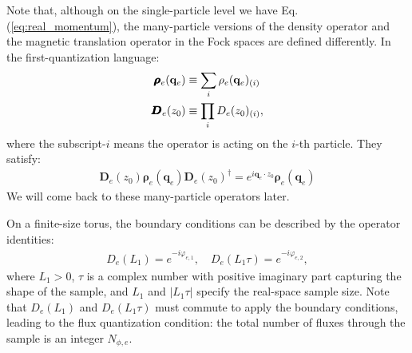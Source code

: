 Note that, although on the single-particle level we have Eq.(\ref{eq:real_momentum}),  the many-particle versions of the density operator and the magnetic translation operator in the Fock spaces are defined differently. In the first-quantization language:
\begin{align}
    \pmb{\boldsymbol\rho}_e(\mathbf q_e) & \equiv \sum_i \rho_e(\mathbf q_e)_{(i)}\notag \\
    \pmb{\bm D}_e(z_0)                   & \equiv \prod_i D_e(z_0)_{(i)},
\end{align}
where the subscript-$i$ means the operator is acting on the $i$-th particle. They satisfy:
\begin{align}
    \pmb{\bm D}_e(z_0)\pmb{\boldsymbol\rho}_e(\mathbf q_e)\pmb{\bm D}_e(z_0)^\dagger=e^{i\mathbf q_e\cdot z_0}\pmb{\boldsymbol\rho}_e(\mathbf q_e)\label{eq:D_e_rho_e}
\end{align}
We will come back to these many-particle operators later.

On a finite-size torus, the boundary conditions can be described by the operator identities:
\begin{align}
    D_e(L_1)=e^{-i\varphi_{e,1}}, \quad D_e(L_1\tau)=e^{-i\varphi_{e,2}},\label{eq:boundary_conditions}
\end{align}
where $L_1>0$, $\tau$ is a complex number with positive imaginary part capturing the shape of the sample, and $L_1$ and $|L_1\tau|$ specify the real-space sample size. Note that $D_e(L_1)$ and $D_e(L_1\tau)$ must commute to apply the boundary conditions, leading to the flux quantization condition: the total number of fluxes through the sample is an integer $N_{\phi,e}$.

